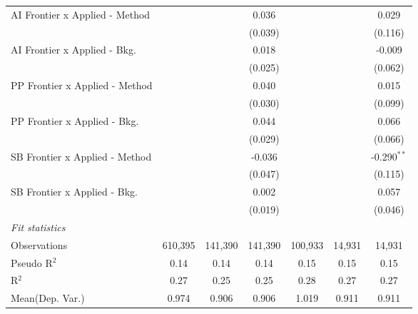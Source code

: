 \begin{tabular}{lcccccc}
   AI Frontier x Applied - Method &               &               & 0.036         &               &               & 0.029\\   
                                  &               &               & (0.039)       &               &               & (0.116)\\   
   AI Frontier x Applied - Bkg.   &               &               & 0.018         &               &               & -0.009\\   
                                  &               &               & (0.025)       &               &               & (0.062)\\   
   PP Frontier x Applied - Method &               &               & 0.040         &               &               & 0.015\\   
                                  &               &               & (0.030)       &               &               & (0.099)\\   
   PP Frontier x Applied - Bkg.   &               &               & 0.044         &               &               & 0.066\\   
                                  &               &               & (0.029)       &               &               & (0.066)\\   
   SB Frontier x Applied - Method &               &               & -0.036        &               &               & -0.290$^{**}$\\   
                                  &               &               & (0.047)       &               &               & (0.115)\\   
   SB Frontier x Applied - Bkg.   &               &               & 0.002         &               &               & 0.057\\   
                                  &               &               & (0.019)       &               &               & (0.046)\\   
   \midrule
   \emph{Fit statistics}\\
   Observations                   & 610,395       & 141,390       & 141,390       & 100,933       & 14,931        & 14,931\\  
   Pseudo R$^2$                   & 0.14          & 0.14          & 0.14          & 0.15          & 0.15          & 0.15\\  
   R$^2$                          & 0.27          & 0.25          & 0.25          & 0.28          & 0.27          & 0.27\\  
Mean(Dep. Var.) & 0.974 & 0.906 & 0.906 & 1.019 & 0.911 & 0.911 \\
   

\end{tabular}
